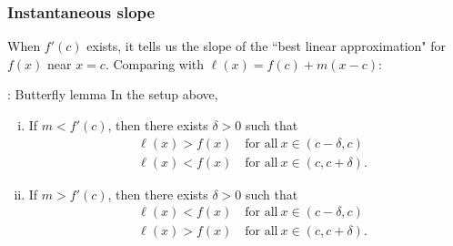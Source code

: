 \subsubsection{Instantaneous slope}
When \(f'(c)\) exists, it tells us the slope of the ``best linear approximation" for \(f(x)\) near \(x=c\). Comparing with \(\ell(x)=f(c)+m(x-c)\):

\begin{ntheorem}{: Butterfly lemma}
	In the setup above, 
	\begin{enumerate}[(i)]
		\item If \(m<f'(c)\), then there exists \(\delta>0\) such that 
		\begin{align*}
			&\ell(x)>f(x)\quad\text{for all}~x\in(c-\delta,c)\\
			&\ell(x)<f(x)\quad\text{for all}~x\in(c,c+\delta).
		\end{align*}
		
		\item If \(m>f'(c)\), then there exists \(\delta>0\) such that 
		\begin{align*}
			&\ell(x)<f(x)\quad\text{for all}~x\in(c-\delta,c)\\
			&\ell(x)>f(x)\quad\text{for all}~x\in(c,c+\delta).
		\end{align*}
	\end{enumerate}
\end{ntheorem}

